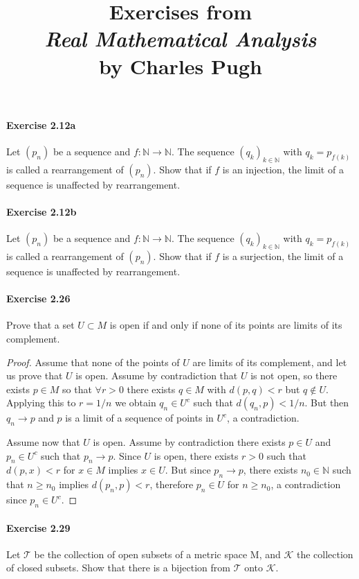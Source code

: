 \documentclass{article}
\title{\textbf{
Exercises from \\
\textit{Real Mathematical Analysis} \\
by Charles Pugh
}}
\date{}
\begin{document}
\maketitle



\paragraph{Exercise 2.12a} Let $(p_n)$ be a sequence and $f:\mathbb{N}\to\mathbb{N}$. The sequence $(q_k)_{k\in\mathbb{N}}$ with $q_k=p_{f(k)}$ is called a rearrangement of $(p_n)$. Show that if $f$ is an injection, the limit of a sequence is unaffected by rearrangement.


\paragraph{Exercise 2.12b} Let $(p_n)$ be a sequence and $f:\mathbb{N}\to\mathbb{N}$. The sequence $(q_k)_{k\in\mathbb{N}}$ with $q_k=p_{f(k)}$ is called a rearrangement of $(p_n)$. Show that if $f$ is a surjection, the limit of a sequence is unaffected by rearrangement.


\paragraph{Exercise 2.26} Prove that a set $U \subset M$ is open if and only if none of its points are limits of its complement.
\begin{proof}
    Assume that none of the points of $U$ are limits of its complement, and let us prove that $U$ is open. Assume by contradiction that $U$ is not open, so there exists $p \in M$ so that $\forall r>0$ there exists $q \in M$ with $d(p, q)<r$ but $q \notin U$. Applying this to $r=1 / n$ we obtain $q_n \in U^c$ such that $d\left(q_n, p\right)<1 / n$. But then $q_n \rightarrow p$ and $p$ is a limit of a sequence of points in $U^c$, a contradiction.

Assume now that $U$ is open. Assume by contradiction there exists $p \in U$ and $p_n \in U^c$ such that $p_n \rightarrow p$. Since $U$ is open, there exists $r>0$ such that $d(p, x)<r$ for $x \in M$ implies $x \in U$. But since $p_n \rightarrow p$, there exists $n_0 \in \mathbb{N}$ such that $n \geq n_0$ implies $d\left(p_n, p\right)<r$, therefore $p_n \in U$ for $n \geq n_0$, a contradiction since $p_n \in U^c$.
\end{proof}



\paragraph{Exercise 2.29} Let $\mathcal{T}$ be the collection of open subsets of a metric space $\mathrm{M}$, and $\mathcal{K}$ the collection of closed subsets. Show that there is a bijection from $\mathcal{T}$ onto $\mathcal{K}$.
\end{document}
